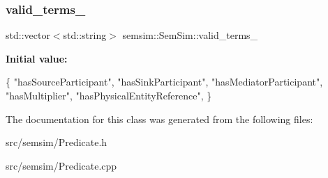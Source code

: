 \subsubsection{\texorpdfstring{valid\+\_\+terms\+\_\+}{valid\_terms\_}}
{\footnotesize\ttfamily std\+::vector$<$std\+::string$>$ semsim\+::\+Sem\+Sim\+::valid\+\_\+terms\+\_\+}

{\bfseries Initial value\+:}
\begin{DoxyCode}
\{
                \textcolor{stringliteral}{"hasSourceParticipant"},
                \textcolor{stringliteral}{"hasSinkParticipant"},
                \textcolor{stringliteral}{"hasMediatorParticipant"},
                \textcolor{stringliteral}{"hasMultiplier"},
                \textcolor{stringliteral}{"hasPhysicalEntityReference"},
        \}
\end{DoxyCode}


The documentation for this class was generated from the following files\+:\begin{DoxyCompactItemize}
\item 
src/semsim/Predicate.\+h\item 
src/semsim/Predicate.\+cpp\end{DoxyCompactItemize}
